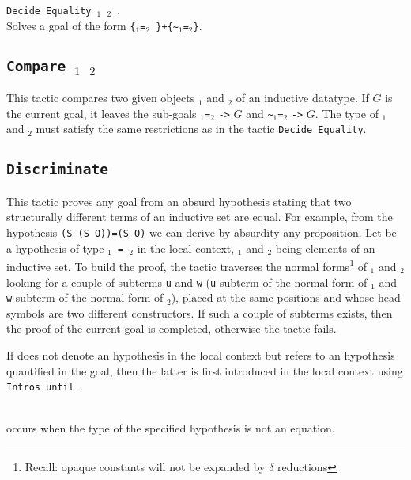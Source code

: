 \begin{Variants}
\item {\tt Decide Equality {\term}$_1$ {\term}$_2$ }.\\
 Solves a goal of the form {\tt \{}\term$_1${\tt =}\term$_2${\tt
\}+\{\verb|~|}\term$_1${\tt =}\term$_2${\tt \}}.
\end{Variants}

\subsection{\tt Compare \term$_1$ \term$_2$}
This tactic compares two given objects \term$_1$ and \term$_2$ 
of an inductive datatype. If $G$ is the current goal, it leaves the sub-goals
\term$_1${\tt =}\term$_2$ {\tt ->} $G$ and \verb|~|\term$_1${\tt =}\term$_2$
{\tt ->} $G$. The type
of \term$_1$ and \term$_2$ must satisfy the same restrictions as in the tactic
\texttt{Decide Equality}.

\subsection {\tt Discriminate {\ident}}
\label{Discriminate}
This tactic proves any goal from an absurd
hypothesis stating that two structurally different terms of an
inductive set are equal. For example, from the hypothesis {\tt (S (S
  O))=(S O)} we can derive by absurdity any proposition.  Let {\ident}
be a hypothesis of type {\tt{\term$_1$} = {\term$_2$}} in the local
context, {\term$_1$} and {\term$_2$} being elements of an inductive set.
To build the proof, the tactic traverses the normal
forms\footnote{Recall: opaque constants will not be expanded by
  $\delta$ reductions} of {\term$_1$} and {\term$_2$} looking for a
couple of subterms {\tt u} and {\tt w} ({\tt u} subterm of the normal
form of {\term$_1$} and {\tt w} subterm of the normal form of
{\term$_2$}), placed at the same positions and whose
head symbols are two different constructors. If such a couple of subterms
exists, then the proof of the current goal is completed,
otherwise the tactic fails.

\Rem If {\ident} does not denote an hypothesis in the local context
but refers to an hypothesis quantified in the goal, then the
latter is first introduced in the local context using
\texttt{Intros until \ident}.

\begin{ErrMsgs}
\item {\ident}  \\
  occurs when the type of the specified hypothesis is not an equation.
\end{ErrMsgs}  

